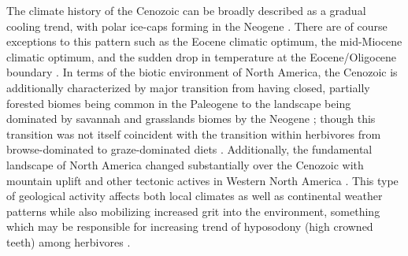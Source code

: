 \documentclass[12pt,letterpaper]{article}
\begin{document}
The climate history of the Cenozoic can be broadly described as a gradual cooling trend, with polar ice-caps forming in the Neogene \citep{Zachos2001,Zachos2008,Cramer2011}. There are of course exceptions to this pattern such as the Eocene climatic optimum, the mid-Miocene climatic optimum, and the sudden drop in temperature at the Eocene/Oligocene boundary \citep{Zachos2001,Zachos2008}. In terms of the biotic environment of North America, the Cenozoic is additionally characterized by major transition from having closed, partially forested biomes being common in the Paleogene to the landscape being dominated by savannah and grasslands biomes by the Neogene \citep{Blois2009,Janis1993b,Janis2000,Stromberg2005}; though this transition was not itself coincident with the transition within herbivores from browse-dominated to graze-dominated diets \citep{Stromberg2005}. Additionally, the fundamental landscape of North America changed substantially over the Cenozoic with mountain uplift and other tectonic actives in Western North America \citep{Blois2009,Eronen2015,Janis2008a,Badgley2013}. This type of geological activity affects both local climates as well as continental weather patterns while also mobilizing increased grit into the environment, something which may be responsible for increasing trend of hyposodony (high crowned teeth) among herbivores \citep{Jardine2012,Jernvall2002,Damuth2011}.

\end{document}
